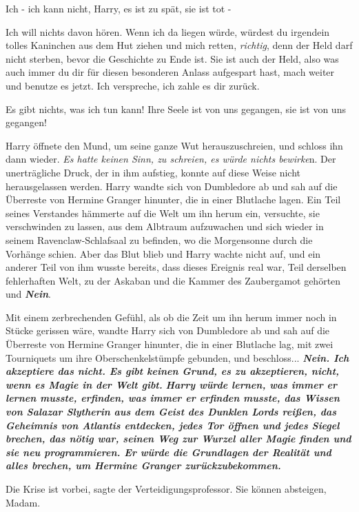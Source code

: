 \glqq{}Ich - ich kann nicht, Harry, es ist zu spät, sie ist tot -\grqq{}

\glqq{}Ich will nichts davon hören. Wenn ich da liegen würde, würdest du
irgendein tolles Kaninchen aus dem Hut ziehen und mich retten, \emph{richtig},
denn der Held darf nicht sterben, bevor die Geschichte zu Ende ist. Sie ist auch
der Held, also was auch immer du dir für diesen besonderen Anlass aufgespart
hast, mach weiter und benutze es jetzt. Ich verspreche, ich zahle es dir
zurück.\grqq{}

\glqq{}Es gibt nichts, was ich tun kann! Ihre Seele ist von uns gegangen, sie ist
von uns gegangen!\grqq{}

Harry öffnete den Mund, um seine ganze Wut herauszuschreien, und schloss ihn
dann wieder. \emph{Es hatte keinen Sinn, zu schreien, es würde nichts bewirke}n.
Der unerträgliche Druck, der in ihm aufstieg, konnte auf diese Weise nicht
herausgelassen werden. Harry wandte sich von Dumbledore ab und sah auf die
Überreste von Hermine Granger hinunter, die in einer Blutlache lagen. Ein Teil
seines Verstandes hämmerte auf die Welt um ihn herum ein, versuchte, sie
verschwinden zu lassen, aus dem Albtraum aufzuwachen und sich wieder in seinem
Ravenclaw-Schlafsaal zu befinden, wo die Morgensonne durch die Vorhänge schien.
Aber das Blut blieb und Harry wachte nicht auf, und ein anderer Teil von ihm
wusste bereits, dass dieses Ereignis real war, Teil derselben fehlerhaften Welt,
zu der Askaban und die Kammer des Zaubergamot gehörten und \textbf{\emph{Nein}}.

Mit einem zerbrechenden Gefühl, als ob die Zeit um ihn herum immer noch in
Stücke gerissen wäre, wandte Harry sich von Dumbledore ab und sah auf die
Überreste von Hermine Granger hinunter, die in einer Blutlache lag, mit zwei
Tourniquets um ihre Oberschenkelstümpfe gebunden, und beschloss...
\textbf{}
\textbf{\emph{Nein. Ich akzeptiere das nicht. Es gibt keinen Grund, es zu
akzeptieren, nicht, wenn es Magie in der Welt gibt.}} \textbf{}
\textbf{\emph{Harry würde lernen, was immer er lernen musste, erfinden, was
immer er erfinden musste, das Wissen von Salazar Slytherin aus dem Geist des
Dunklen Lords reißen, das Geheimnis von Atlantis entdecken, jedes Tor öffnen und
jedes Siegel brechen, das nötig war, seinen Weg zur Wurzel aller Magie finden
und sie neu programmieren. Er würde die Grundlagen der Realität und alles
brechen, um Hermine Granger zurückzubekommen.}}

\glqq{}Die Krise ist vorbei\grqq{}, sagte der Verteidigungsprofessor. \glqq{}Sie
können absteigen, Madam.\grqq{}

